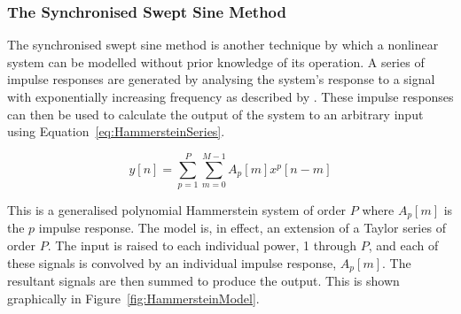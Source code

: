 		\subsubsection{The Synchronised Swept Sine Method}
			The synchronised swept sine method is another technique by which a nonlinear system can be modelled
			without prior knowledge of its operation. A series of impulse responses are generated by analysing
			the system's response to a signal with exponentially increasing frequency as described by
			\citet{novak2010nonlinear}. These impulse responses can then be used to calculate the output of the
			system to an arbitrary input using Equation~\ref{eq:HammersteinSeries}.

			\begin{equation}
				y[n] = \sum_{p = 1}^{P}
					\sum_{m = 0}^{M - 1} A_{p}[m]x^{p}[n-m]
				\label{eq:HammersteinSeries}
			\end{equation}

			This is a generalised polynomial Hammerstein system of order $P$ where $A_{p}[m]$ is the
			$p$ impulse response. The model is, in effect, an extension of a Taylor series of order
			$P$. The input is raised to each individual power, 1 through $P$, and each of these signals is
			convolved by an individual impulse response, $A_{p}[m]$. The resultant signals are then summed to
			produce the output. This is shown graphically in Figure~\ref{fig:HammersteinModel}.

